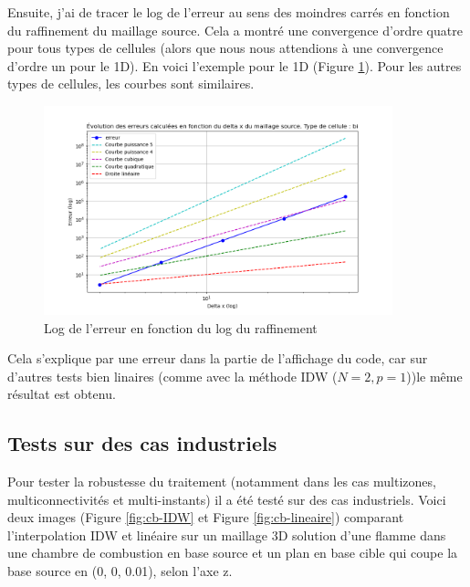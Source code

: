 Ensuite, j'ai de tracer le log de l'erreur au sens des moindres carrés en fonction du raffinement du maillage source. Cela a montré une convergence d'ordre quatre pour tous types de cellules (alors que nous nous attendions à une convergence d'ordre un pour le 1D). En voici l'exemple pour le 1D (Figure \ref{fig:bi}). Pour les autres types de cellules, les courbes sont similaires. 
\begin{figure}[H]
    \centering
    \includegraphics[width=0.90\textwidth]{images/err_puissance2_bi.png}
    \caption{Log de l'erreur en fonction du log du raffinement}
    \label{fig:bi}
\end{figure}
Cela s'explique par une erreur dans la partie de l'affichage du code, car sur d'autres tests bien linaires (comme avec la méthode IDW (\(N=2, p=1\)))le même résultat est obtenu.

\subsection{Tests sur des cas industriels}

Pour tester la robustesse du traitement (notamment dans les cas multizones, multiconnectivités et multi-instants) il a été testé sur des cas industriels.
Voici deux images (Figure \ref{fig:cb-IDW} et Figure \ref{fig:cb-lineaire}) comparant l'interpolation IDW et linéaire sur un maillage 3D solution d'une flamme dans une chambre de combustion en base source et un plan en base cible qui coupe la base source en (0, 0, 0.01), selon l'axe z.

